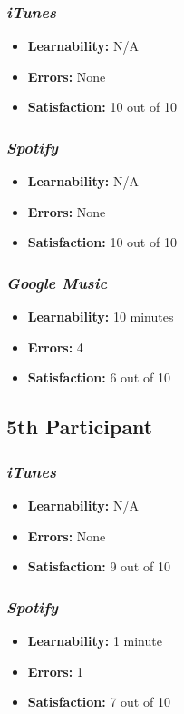 \documentclass{article}
\begin{document}
{\begin{multicols}{2}
\subsubsection{\it iTunes}
\begin{itemize}
	\item {\bf Learnability:} N/A
	\item {\bf Errors:}  None
	\item {\bf Satisfaction:} 10 out of 10 
\end{itemize}

\subsubsection{\it Spotify}
\begin{itemize}
	\item {\bf Learnability:} N/A
	\item {\bf Errors:} None
	\item {\bf Satisfaction:} 10 out of 10 
\end{itemize}

\subsubsection{\it Google Music}
\begin{itemize}
\item {\bf Learnability:} 10 minutes
	\item {\bf Errors:} 4
	\item {\bf Satisfaction:} 6 out of 10 
\end{itemize}

\subsection{5th Participant}

\subsubsection{\it iTunes}
\begin{itemize}
	\item {\bf Learnability:} N/A
	\item {\bf Errors:}  None
	\item {\bf Satisfaction:} 9 out of 10 
\end{itemize}

\subsubsection{\it Spotify}
\begin{itemize}
	\item {\bf Learnability:} 1 minute
	\item {\bf Errors:} 1
	\item {\bf Satisfaction:} 7 out of 10 
\end{itemize}


\end{multicols}}
\end{document}
